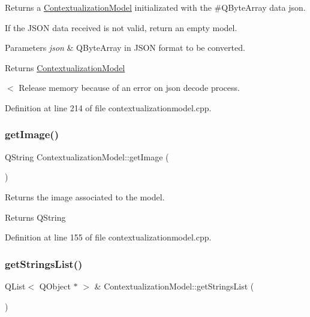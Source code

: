 Returns a \mbox{\hyperlink{classContextualizationModel}{Contextualization\+Model}} initializated with the \#\+Q\+Byte\+Array data json. 

If the J\+S\+ON data received is not valid, return an empty model. 
\begin{DoxyParams}{Parameters}
{\em json} & Q\+Byte\+Array in J\+S\+ON format to be converted. \\
\hline
\end{DoxyParams}
\begin{DoxyReturn}{Returns}
\mbox{\hyperlink{classContextualizationModel}{Contextualization\+Model}} 
\end{DoxyReturn}
$<$ Release memory because of an error on json decode process. 

Definition at line 214 of file contextualizationmodel.\+cpp.

\mbox{\label{classContextualizationModel_a930b89fa044d406be44836cde09be11c}} 
\subsubsection{\texorpdfstring{get\+Image()}{getImage()}}
{\footnotesize\ttfamily Q\+String Contextualization\+Model\+::get\+Image (\begin{DoxyParamCaption}{ }\end{DoxyParamCaption})}



Returns the image associated to the model. 

\begin{DoxyReturn}{Returns}
Q\+String 
\end{DoxyReturn}


Definition at line 155 of file contextualizationmodel.\+cpp.

\mbox{\label{classContextualizationModel_ac098ebbf5cce5aac14182adddf7610e4}} 
\subsubsection{\texorpdfstring{get\+Strings\+List()}{getStringsList()}}
{\footnotesize\ttfamily Q\+List$<$ Q\+Object $\ast$ $>$ \& Contextualization\+Model\+::get\+Strings\+List (\begin{DoxyParamCaption}{ }\end{DoxyParamCaption})}



